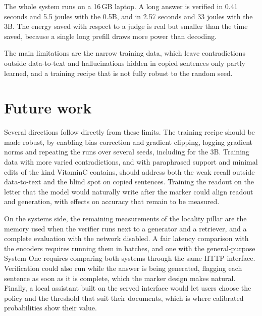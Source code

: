 The whole system runs on a 16\,GB laptop. A long answer is verified in 0.41 seconds and 5.5 joules with the 0.5B, and in
2.57 seconds and 33 joules with the 3B. The energy saved with respect to a judge is real but smaller than the time saved,
because a single long prefill draws more power than decoding.

The main limitations are the narrow training data, which leave contradictions outside data-to-text and hallucinations
hidden in copied sentences only partly learned, and a training recipe that is not fully robust to the random seed.

\section{Future work}
\label{sec:concl-future}

Several directions follow directly from these limits. The training recipe should be made robust, by enabling bias
correction and gradient clipping, logging gradient norms and repeating the runs over several seeds, including for the 3B.
Training data with more varied contradictions, and with paraphrased support and minimal edits of the kind VitaminC
contains, should address both the weak recall outside data-to-text and the blind spot on copied sentences. Training the
readout on the letter that the model would naturally write after the marker could align readout and generation, with
effects on accuracy that remain to be measured.

On the systems side, the remaining measurements of the locality pillar are the memory used when the verifier runs next
to a generator and a retriever, and a complete evaluation with the network disabled. A fair latency comparison with the
encoders requires running them in batches, and one with the general-purpose System One requires comparing both systems
through the same HTTP interface. Verification could also run while the answer is being generated, flagging each sentence
as soon as it is complete, which the marker design makes natural. Finally, a local assistant built on the served
interface would let users choose the policy and the threshold that suit their documents, which is where calibrated
probabilities show their value.
